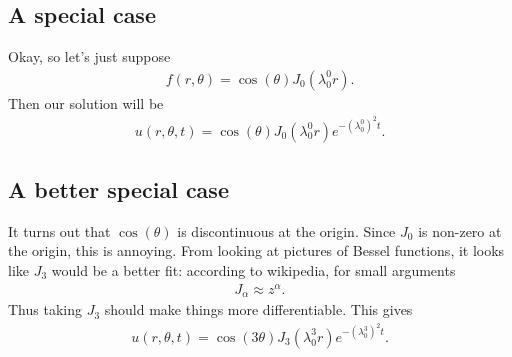 \documentclass[a4paper,10pt]{article}
\begin{document}
\subsection*{A special case}
Okay, so let's just suppose
\begin{align*}
	f(r, \theta) = \cos(\theta) J_0(\lambda^0_0 r).
\end{align*}
Then our solution will be
\begin{align*}
	u(r, \theta, t) = \cos( \theta) J_0(\lambda^0_0 r) e^{-(\lambda^0_0)^2 t}.
\end{align*}

\subsection{A better special case} %
\label{sub:A better special case}
It turns out that $\cos(\theta)$ is discontinuous at the origin.  Since $J_0$ is non-zero at the origin, this is annoying.  From looking at pictures of Bessel functions, it looks like $J_3$ would be a better fit: according to wikipedia, for small arguments
 \begin{align*}
 	J_\alpha \approx z^\alpha.
 \end{align*}
Thus taking $J_3$ should make things more differentiable.  This gives
\begin{align*}
	u(r, \theta, t) = \cos(3 \theta) J_3(\lambda^3_0 r) e^{-(\lambda^3_0)^2 t}.
\end{align*}

\end{document}

